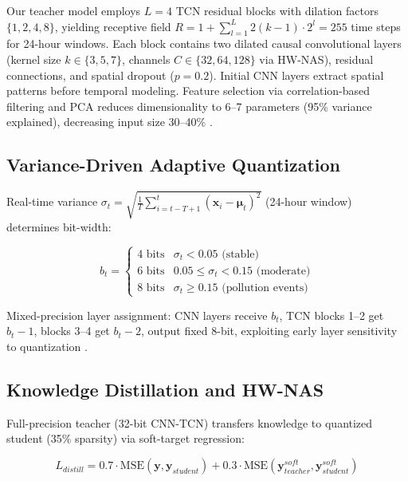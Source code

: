 \documentclass[12pt,a4paper]{article}
\begin{document}
Our teacher model employs $L=4$ TCN residual blocks with dilation factors $\{1, 2, 4, 8\}$, yielding receptive field $R = 1 + \sum_{l=1}^{L} 2(k-1) \cdot 2^l = 255$ time steps for 24-hour windows. Each block contains two dilated causal convolutional layers (kernel size $k \in \{3, 5, 7\}$, channels $C \in \{32, 64, 128\}$ via HW-NAS), residual connections, and spatial dropout ($p=0.2$). Initial CNN layers extract spatial patterns before temporal modeling. Feature selection via correlation-based filtering and PCA reduces dimensionality to 6--7 parameters (95\% variance explained), decreasing input size 30--40\% \citep{essamlali2024iotml}.

\subsection{Variance-Driven Adaptive Quantization}

Real-time variance $\sigma_t = \sqrt{\frac{1}{T} \sum_{i=t-T+1}^{t} (\mathbf{x}_i - \boldsymbol{\mu}_t)^2}$ (24-hour window) determines bit-width:

\begin{equation}
\label{eq:adaptive_quant}
b_t = \begin{cases} 
4 \text{ bits} & \sigma_t < 0.05 \text{ (stable)} \\
6 \text{ bits} & 0.05 \leq \sigma_t < 0.15 \text{ (moderate)} \\
8 \text{ bits} & \sigma_t \geq 0.15 \text{ (pollution events)}
\end{cases}
\end{equation}

Mixed-precision layer assignment: CNN layers receive $b_t$, TCN blocks 1--2 get $b_t-1$, blocks 3--4 get $b_t-2$, output fixed 8-bit, exploiting early layer sensitivity to quantization \citep{rakka2024mixedapprox}.

\subsection{Knowledge Distillation and HW-NAS}

Full-precision teacher (32-bit CNN-TCN) transfers knowledge to quantized student (35\% sparsity) via soft-target regression:

\begin{equation}
\label{eq:distillation}
L_{distill} = 0.7 \cdot \text{MSE}(\mathbf{y}, \mathbf{y}_{student}) + 0.3 \cdot \text{MSE}(\mathbf{y}_{teacher}^{soft}, \mathbf{y}_{student}^{soft})
\end{equation}
\end{document}
